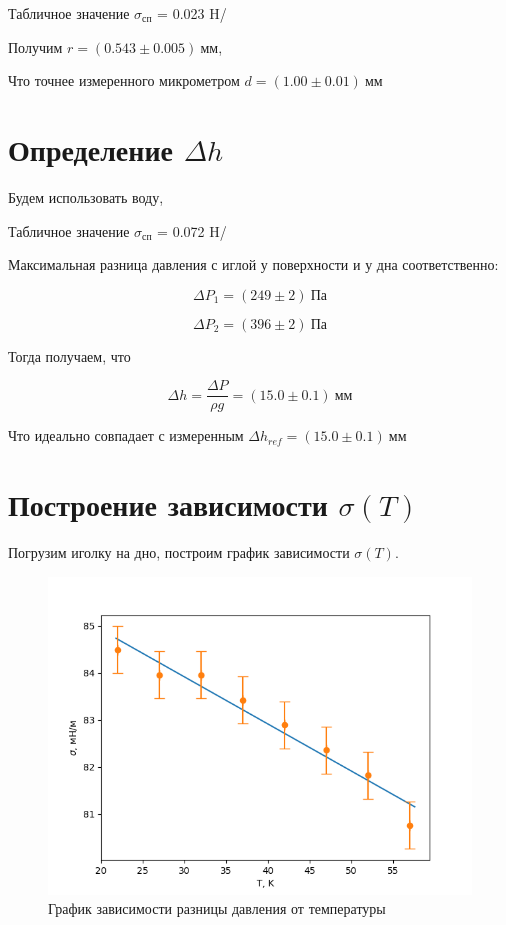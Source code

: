 \documentclass[a4paper]{article}
\begin{document}
Табличное значение $\sigma_\text{сп}$ = 0.023 H/

Получим $r = (0.543 \pm 0.005) \: \text{мм}$,

Что точнее измеренного микрометром $ d = (1.00 \pm 0.01)\:\text{мм} $

\section{Определение $\Delta h$}

Будем использовать воду, 

Табличное значение $\sigma_\text{сп}$ = 0.072 H/

Максимальная разница давления 
с иглой у поверхности и у дна соответственно: 

\begin{equation*}
    \Delta P_1 = (249 \pm 2) \: \text{Па}
\end{equation*}

\begin{equation*}
    \Delta P_2 = (396 \pm 2) \: \text{Па}
\end{equation*}

Тогда получаем, что 

\begin{equation*}
    \Delta h = \frac{\Delta P}{\rho g} = (15.0 \pm 0.1) \: \text{мм}
\end{equation*}

Что идеально совпадает с измеренным $\Delta h_{ref} = (15.0 \pm 0.1) \: \text{мм}$

\section{Построение зависимости $\sigma(T)$}

Погрузим иголку на дно, построим график зависимости $\sigma(T)$.

\begin{figure}[h!]
    \center
    \includegraphics[scale=1.0]{sigma(t).png}
    \caption{График зависимости разницы давления от температуры}
\end{figure}
\end{document}

